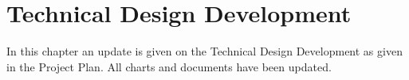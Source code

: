 \chapter{Technical Design Development}
\label{technDesignDev}
In this chapter an update is given on the Technical Design Development as given in the Project Plan. All charts and documents have been updated.